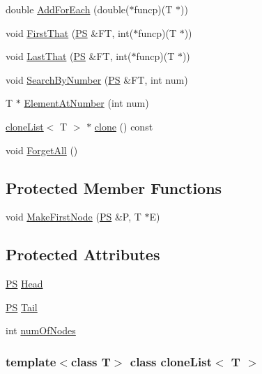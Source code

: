 \begin{DoxyCompactItemize}
\item 
double \hyperlink{classclone_list_a6bc26e4ddd491562d7349b0c4f7cf445}{AddForEach} (double($\ast$funcp)(T $\ast$))
\item 
void \hyperlink{classclone_list_a81bb55f92d51e3ffbeff53440537c84d}{FirstThat} (\hyperlink{structclone_list_1_1_snode}{PS} \&FT, int($\ast$funcp)(T $\ast$))
\item 
void \hyperlink{classclone_list_a5aca1d18d864f64a22a7f148e4e77dbf}{LastThat} (\hyperlink{structclone_list_1_1_snode}{PS} \&FT, int($\ast$funcp)(T $\ast$))
\item 
void \hyperlink{classclone_list_a0f871eb3e2f58a5c391fea0559e3e9fb}{SearchByNumber} (\hyperlink{structclone_list_1_1_snode}{PS} \&FT, int num)
\item 
T $\ast$ \hyperlink{classclone_list_a761c3700fcf12c3f48b3c34d2a0aef7f}{ElementAtNumber} (int num)
\item 
\hyperlink{classclone_list}{cloneList}$<$ T $>$ $\ast$ \hyperlink{classclone_list_ac5e49d0132613e2bc1b5d148e83b22c7}{clone} () const 
\item 
void \hyperlink{classclone_list_a2e8c386500df44e04d8a8642ace18762}{ForgetAll} ()
\end{DoxyCompactItemize}
\subsection*{Protected Member Functions}
\begin{DoxyCompactItemize}
\item 
void \hyperlink{classclone_list_acf959c1920c2b448fa4f68c35ce90044}{MakeFirstNode} (\hyperlink{structclone_list_1_1_snode}{PS} \&P, T $\ast$E)
\end{DoxyCompactItemize}
\subsection*{Protected Attributes}
\begin{DoxyCompactItemize}
\item 
\hyperlink{structclone_list_1_1_snode}{PS} \hyperlink{classclone_list_a63ed3a2d8150bd059b176d2e3ac5264c}{Head}
\item 
\hyperlink{structclone_list_1_1_snode}{PS} \hyperlink{classclone_list_afc47ac761c75b14e0965888da6370790}{Tail}
\item 
int \hyperlink{classclone_list_a48e08f8fdedcda74b4d6afa17774e528}{numOfNodes}
\end{DoxyCompactItemize}
\subsubsection*{template$<$class T$>$ class cloneList$<$ T $>$}



